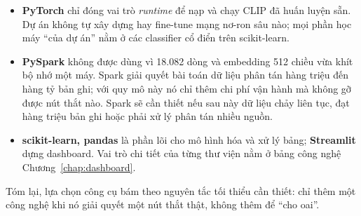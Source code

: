 \begin{itemize}[leftmargin=*]
  \item \textbf{PyTorch} chỉ đóng vai trò \emph{runtime} để nạp và chạy CLIP đã
        huấn luyện sẵn. Dự án không tự xây dựng hay fine-tune mạng nơ-ron sâu
        nào; mọi phần học máy ``của dự án'' nằm ở các classifier cổ điển trên
        scikit-learn.
  \item \textbf{PySpark} không được dùng vì 18.082 dòng và embedding 512 chiều
        vừa khít bộ nhớ một máy. Spark giải quyết bài toán dữ liệu phân tán hàng
        triệu đến hàng tỷ bản ghi; với quy mô này nó chỉ thêm chi phí vận hành mà
        không gỡ được nút thắt nào. Spark sẽ cần thiết nếu sau này dữ liệu chảy
        liên tục, đạt hàng triệu bản ghi hoặc phải xử lý phân tán nhiều nguồn.
  \item \textbf{scikit-learn, pandas} là phần lõi cho mô hình hóa và xử lý bảng;
        \textbf{Streamlit} dựng dashboard. Vai trò chi tiết của từng thư viện
        nằm ở bảng công nghệ Chương~\ref{chap:dashboard}.
\end{itemize}

Tóm lại, lựa chọn công cụ bám theo nguyên tắc tối thiểu cần thiết: chỉ thêm một
công nghệ khi nó giải quyết một nút thắt thật, không thêm để ``cho oai''.
